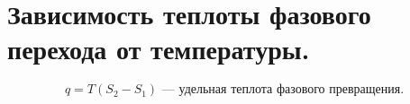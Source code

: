 \section{\normalsize Зависимость теплоты фазового перехода от температуры.}
$$q=T(S_2-S_1)\text{ --- удельная теплота фазового превращения.}$$